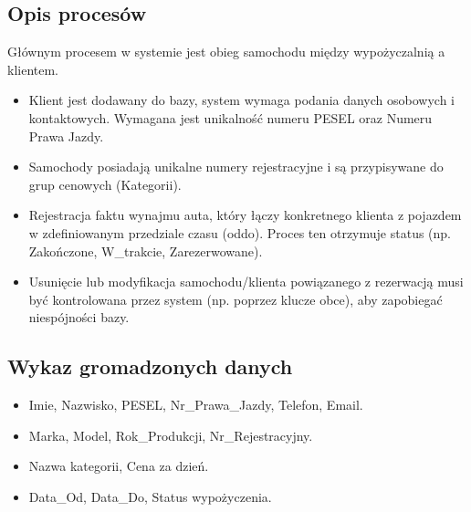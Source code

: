 \documentclass[a4paper,11pt,english,openany,oneside]{sphinxmanual}
\begin{document}
\subsection{Opis procesów}
\label{\detokenize{rozdzial_3/index:opis-procesow}}
\sphinxAtStartPar
Głównym procesem w systemie jest obieg samochodu między wypożyczalnią a klientem.
\begin{itemize}
\item {} 
\sphinxAtStartPar
{} Klient jest dodawany do bazy, system wymaga podania danych osobowych i kontaktowych. Wymagana jest unikalność numeru PESEL oraz Numeru Prawa Jazdy.

\item {} 
\sphinxAtStartPar
{} Samochody posiadają unikalne numery rejestracyjne i są przypisywane do grup cenowych (Kategorii).

\item {} 
\sphinxAtStartPar
{} Rejestracja faktu wynajmu auta, który łączy konkretnego klienta z pojazdem w zdefiniowanym przedziale czasu (od\sphinxhyphen{}do). Proces ten otrzymuje status (np. Zakończone, W\_trakcie, Zarezerwowane).

\item {} 
\sphinxAtStartPar
{} Usunięcie lub modyfikacja samochodu/klienta powiązanego z rezerwacją musi być kontrolowana przez system (np. poprzez klucze obce), aby zapobiegać niespójności bazy.

\end{itemize}


\subsection{Wykaz gromadzonych danych}
\label{\detokenize{rozdzial_3/index:wykaz-gromadzonych-danych}}\begin{itemize}
\item {} 
\sphinxAtStartPar
{} Imie, Nazwisko, PESEL, Nr\_Prawa\_Jazdy, Telefon, Email.

\item {} 
\sphinxAtStartPar
{} Marka, Model, Rok\_Produkcji, Nr\_Rejestracyjny.

\item {} 
\sphinxAtStartPar
{} Nazwa kategorii, Cena za dzień.

\item {} 
\sphinxAtStartPar
{} Data\_Od, Data\_Do, Status wypożyczenia.

\end{itemize}
\end{document}
